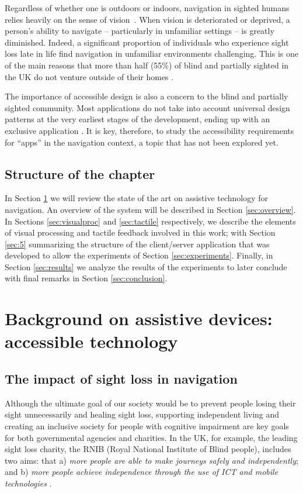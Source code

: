 Regardless of whether one is outdoors or indoors, navigation in sighted humans relies heavily on the sense of vision~\citep{kalia2008learning,tsuji2005landmarks}. When vision is deteriorated or deprived, a person's ability to navigate -- particularly in unfamiliar settings -- is greatly diminished. Indeed, a significant proportion of individuals who experience sight loss late in life find navigation in unfamiliar environments challenging. This is one of the main reasons that more than half (55\%) of blind and partially sighted in the UK do not venture outside of their homes \citep{Worsfold2010}.

The importance of accessible design is also a concern to the blind and partially sighted community. Most applications do not take into account universal design patterns at the very earliest stages of the development, ending up with an exclusive application \citep{AndroidHackathon}. It is key, therefore, to study the accessibility requirements for ``apps'' in the navigation context, a topic that has not been explored yet.


\subsection{Structure of the chapter}

In Section \ref{sec:2} we will review the state of the art on assistive technology for navigation. An overview of the system will be described in Section \ref{sec:overview}. In Sections \ref{sec:visualproc} and \ref{sec:tactile} respectively, we describe the elements of visual processing and tactile feedback involved in this work; with Section \ref{sec:5} summarizing the structure of the client/server application that was developed to allow the experiments of Section \ref{sec:experiments}. Finally, in Section \ref{sec:results} we analyze the results of the experiments to later conclude with final remarks in Section \ref{sec:conclusion}.

\section{Background on assistive devices: accessible technology}
\label{sec:2}

\subsection{The impact of sight loss in navigation}

Although the ultimate goal of our society would be to prevent people losing their sight unnecessarily and healing sight loss, supporting independent living and creating an inclusive society for people with cognitive impairment are key goals for both governmental agencies and charities. In the UK, for example, the leading sight loss charity, the RNIB (Royal National Institute of Blind people), includes two aims: that a) \textit{more people are able to make journeys safely and independently}; and b) \textit{more people achieve independence through the use of ICT and mobile technologies} \citep{RNIB2009}.

